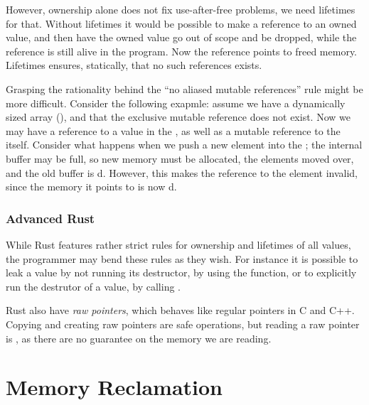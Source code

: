 \documentclass[b5paper,twoside]{report}
\begin{document}
However, ownership alone does not fix use-after-free problems, we need lifetimes for that.
Without lifetimes it would be possible to make a reference to an owned value, and then
have the owned value go out of scope and be dropped, while the reference is still alive
in the program. Now the reference points to freed memory. Lifetimes ensures, statically,
that no such references exists.

Grasping the rationality behind the ``no aliased mutable references'' rule might
be more difficult. Consider the following exapmle:
assume we have a dynamically sized array (), and that the exclusive
mutable reference does not exist. Now we may have a reference to a value
in the , as well as a mutable reference to the  itself.
Consider what happens when we push a new element into the ;
the internal buffer may be full, so new memory must be allocated,
the elements moved over, and the old buffer is d.
However, this makes the reference to the element invalid, since the memory
it points to is now d.

\subsection{Advanced Rust}
While Rust features rather strict rules for ownership and lifetimes of all values,
the programmer may bend these rules as they wish.
For instance it is possible to leak a value by not running its destructor,
by using the  function, or to explicitly run the destrutor of
a value, by calling .

Rust also have \emph{raw pointers}, which behaves like regular pointers in C and C++.
Copying and creating raw pointers are safe operations, but reading a raw pointer is
, as there are no guarantee on the memory we are reading.




\chapter{Memory Reclamation}
\end{document}
